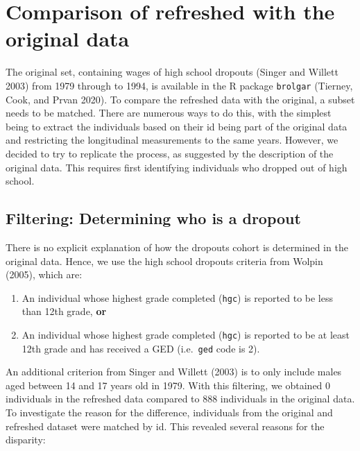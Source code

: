 \documentclass[12pt]{article}
\providecommand{\tightlist}{%
  \setlength{\itemsep}{0pt}\setlength{\parskip}{0pt}}
\begin{document}
\hypertarget{compare}{%
\section{Comparison of refreshed with the original data}\label{compare}}

The original set, containing wages of high school dropouts (Singer and Willett 2003) from 1979 through to 1994, is available in the R package \texttt{brolgar} (Tierney, Cook, and Prvan 2020). To compare the refreshed data with the original, a subset needs to be matched. There are numerous ways to do this, with the simplest being to extract the individuals based on their id being part of the original data and restricting the longitudinal measurements to the same years. However, we decided to try to replicate the process, as suggested by the description of the original data. This requires first identifying individuals who dropped out of high school.

\hypertarget{filtering-determining-who-is-a-dropout}{%
\subsection{Filtering: Determining who is a dropout}\label{filtering-determining-who-is-a-dropout}}

There is no explicit explanation of how the dropouts cohort is determined in the original data. Hence, we use the high school dropouts criteria from Wolpin (2005), which are:

\begin{enumerate}
\def\labelenumi{\arabic{enumi}.}
\tightlist
\item
  An individual whose highest grade completed (\texttt{hgc}) is reported to be less than 12th grade, \textbf{or}
\item
  An individual whose highest grade completed (\texttt{hgc}) is reported to be at least 12th grade and has received a GED (i.e.~\texttt{ged} code is 2).
\end{enumerate}

An additional criterion from Singer and Willett (2003) is to only include males aged between 14 and 17 years old in 1979. With this filtering, we obtained 0 individuals in the refreshed data compared to 888 individuals in the original data. To investigate the reason for the difference, individuals from the original and refreshed dataset were matched by id. This revealed several reasons for the disparity:
\end{document}
